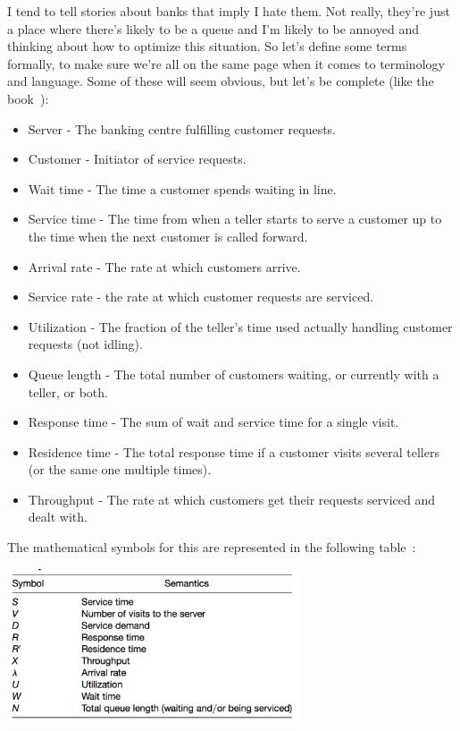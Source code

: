 \documentclass[a4paper]{report}
\begin{document}
I tend to tell stories about banks that imply I hate them. Not really, they're just a place where there's likely to be a queue and I'm likely to be annoyed and thinking about how to optimize this situation. So let's define some terms formally, to make sure we're all on the same page when it comes to terminology and language. Some of these will seem obvious, but let's be complete (like the book~\cite{swps}):

\begin{itemize}
	\item Server - The banking centre fulfilling customer requests.
	\item Customer - Initiator of service requests.
	\item Wait time - The time a customer spends waiting in line.
	\item Service time - The time from when a teller starts to serve a customer up to the time when the next customer is called forward.
	\item Arrival rate - The rate at which customers arrive.
	\item Service rate - the rate at which customer requests are serviced.
	\item Utilization - The fraction of the teller's time used actually handling customer requests (not idling).
	\item Queue length - The total number of customers waiting, or currently with a teller, or both.
	\item Response time - The sum of wait and service time for a single visit.
	\item Residence time - The total response time if a customer visits several tellers (or the same one multiple times).
	\item Throughput - The rate at which customers get their requests serviced and dealt with.
\end{itemize}

The mathematical symbols for this are represented in the following table~\cite{swps}:


\begin{center}
	\includegraphics[width=0.65\textwidth]{images/math-symbols.png}
\end{center}
\end{document}
